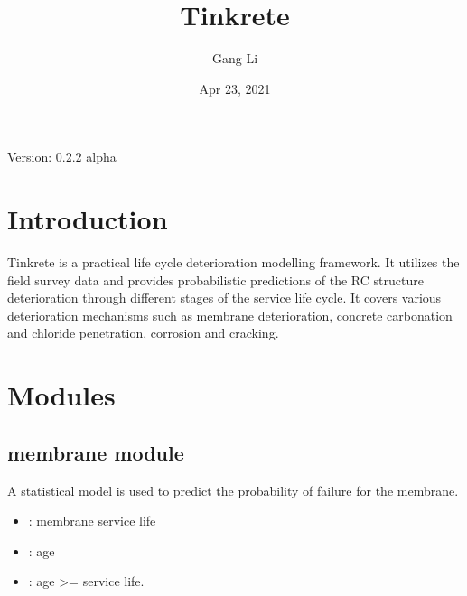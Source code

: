 \documentclass[letterpaper,10pt,english]{sphinxmanual}
\title{Tinkrete}
\date{Apr 23, 2021}
\author{Gang Li}
\begin{document}
\pagestyle{empty}
\sphinxmaketitle
\pagestyle{plain}
\sphinxtableofcontents
\pagestyle{normal}
\label{\detokenize{index::doc}}


\sphinxAtStartPar
Version:
0.2.2
alpha


\chapter{Introduction}
\label{\detokenize{intro:introduction}}\label{\detokenize{intro::doc}}
\sphinxAtStartPar
Tinkrete is a practical life cycle deterioration modelling framework.
It utilizes the field survey data and provides probabilistic predictions of the RC structure deterioration through different stages of the service life cycle.
It covers various deterioration mechanisms such as membrane deterioration, concrete carbonation and chloride penetration, corrosion and cracking.


\chapter{Modules}
\label{\detokenize{modules:modules}}\label{\detokenize{modules::doc}}

\section{membrane module}
\label{\detokenize{membrane:module-membrane}}\label{\detokenize{membrane:membrane-module}}\label{\detokenize{membrane::doc}}
\sphinxAtStartPar
{}

\sphinxAtStartPar
A statistical model is used to predict the probability of failure for the membrane.
\begin{itemize}
\item {} 
\sphinxAtStartPar
{}: membrane service life

\item {} 
\sphinxAtStartPar
{}: age

\item {} 
\sphinxAtStartPar
{}: age \textgreater{}= service life.

\end{itemize}
\end{document}
